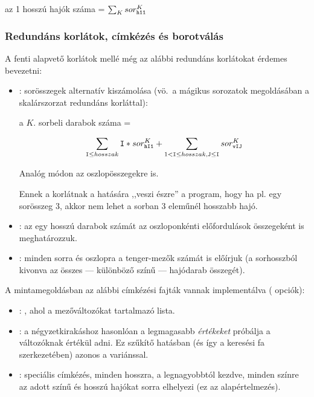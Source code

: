 \begin{center}
az 1 hosszú hajók száma = $\sum_{K} sor^K_{\tt h11} $
\end{center}

\subsubsection{Redundáns korlátok, címkézés és borotválás}

A fenti alapvető korlátok mellé még az alábbi redundáns korlátokat érdemes
bevezetni:

\begin{itemize}
\item {}: sorösszegek alternatív kiszámolása (vö.\ a
mágikus sorozatok megoldásában a skalárszorzat redundáns korláttal):
\begin{center}
a $K$. sorbeli darabok száma = \parbox{19em}{
{\large \[\sum_{\texttt{I}\leq hosszak} \texttt{I}*sor^K_{\texttt{hI1}} + \sum_{1<\texttt{I}\leq hosszak, \texttt{J}\leq \texttt{I}} sor^K_{\texttt{vIJ}}\]}
}\end{center}
Analóg módon az oszlopösszegekre is.

Ennek a korlátnak a hatására ,,veszi észre'' a program, hogy  ha pl. egy
sorösszeg 3, akkor nem lehet a sorban 3 eleműnél hosszabb hajó.

\item {}: az egy hosszú darabok számát az
oszloponkénti előfordulások összegeként is meghatározzuk.
\item {}: minden sorra és oszlopra a tenger-mezők
számát is előírjuk (a sorhosszból kivonva az összes --- különböző színű ---
hajódarab összegét).
\end{itemize}

A mintamegoldásban az alábbi címkézési fajták vannak implementálva
( opciók):

\begin{itemize}
\item {}: , ahol  a mezőváltozókat
        tartalmazó lista.
\item {}: a négyzetkirakáshoz hasonlóan a legmagasabb
        \emph{értékeket} próbálja a változóknak értékül adni. Ez szűkítő
        hatásban (és így a keresési fa szerkezetében) azonos a 
        variánssal.
\item {}: speciális címkézés, minden hosszra, a legnagyobbtól
        kezdve, minden színre az adott színű és hosszú hajókat sorra elhelyezi
        (ez az alapértelmezés).
\end{itemize}

